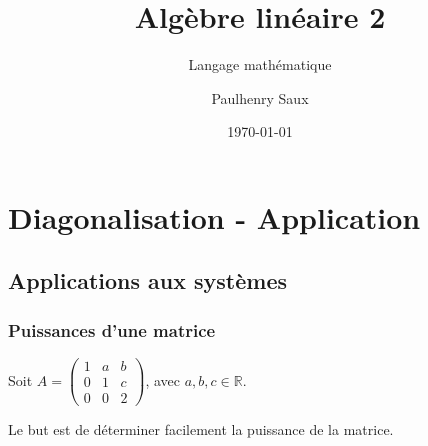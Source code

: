 \documentclass[french]{yLectureNote}
\title{Algèbre linéaire 2}
\subtitle{Langage mathématique}
\author{Paulhenry Saux}
\date{\today}
\begin{document}
\setcounter{chapter}{3}
\chapter{Diagonalisation - Application}
\section{Applications aux systèmes}
\subsection{Puissances d'une matrice}
Soit $A=\begin{pmatrix}1&a&b\\ 0&1&c\\ 0&0&2\end{pmatrix}$, avec $a, b, c\in\mathbb{R}$.

Le but est de déterminer facilement la puissance de la matrice.
\end{document}
